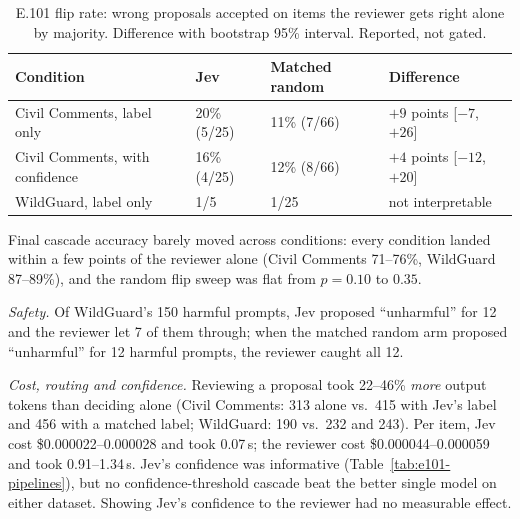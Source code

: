 \documentclass[11pt]{article}
\renewcommand{\_}{\origunderscore\allowbreak}
\begin{document}
\begin{table}[H]
\centering
\small
\caption{E.101 flip rate: wrong proposals accepted on items the reviewer gets right alone by majority. Difference with bootstrap 95\% interval. Reported, not gated.}
\label{tab:e101-flip}
\begin{tabular}{l l l l}
\toprule
Condition & Jev & Matched random & Difference \\
\midrule
Civil Comments, label only & 20\% (5/25) & 11\% (7/66) & $+9$ points [$-7$, $+26$] \\
Civil Comments, with confidence & 16\% (4/25) & 12\% (8/66) & $+4$ points [$-12$, $+20$] \\
WildGuard, label only & 1/5 & 1/25 & not interpretable \\
\bottomrule
\end{tabular}
\end{table}

Final cascade accuracy barely moved across conditions: every condition landed within a few points of the reviewer alone (Civil Comments 71--76\%, WildGuard 87--89\%), and the random flip sweep was flat from $p = 0.10$ to $0.35$.

\emph{Safety.} Of WildGuard's 150 harmful prompts, Jev proposed ``unharmful'' for 12 and the reviewer let 7 of them through; when the matched random arm proposed ``unharmful'' for 12 harmful prompts, the reviewer caught all 12.

\emph{Cost, routing and confidence.} Reviewing a proposal took 22--46\% \emph{more} output tokens than deciding alone (Civil Comments: 313 alone vs.\ 415 with Jev's label and 456 with a matched label; WildGuard: 190 vs.\ 232 and 243). Per item, Jev cost \$0.000022--0.000028 and took 0.07\,s; the reviewer cost \$0.000044--0.000059 and took 0.91--1.34\,s. Jev's confidence was informative (Table~\ref{tab:e101-pipelines}), but no confidence-threshold cascade beat the better single model on either dataset. Showing Jev's confidence to the reviewer had no measurable effect.
\end{document}
